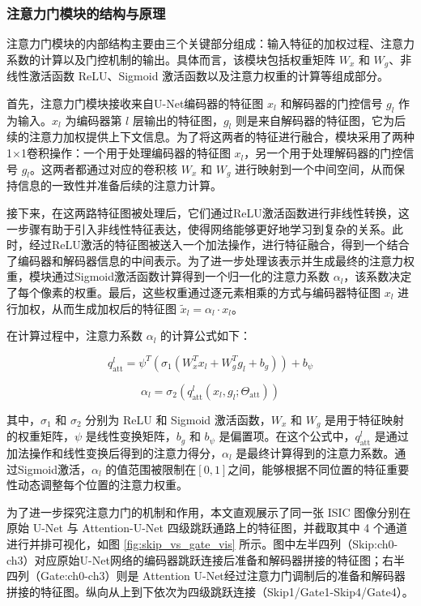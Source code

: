 \subsubsection{注意力门模块的结构与原理}

注意力门模块的内部结构主要由三个关键部分组成：输入特征的加权过程、注意力系数的计算以及门控机制的输出。具体而言，该模块包括权重矩阵 $W_x$ 和 $W_g$、非线性激活函数 ReLU、Sigmoid 激活函数以及注意力权重的计算等组成部分。

首先，注意力门模块接收来自U-Net编码器的特征图 $x_l$ 和解码器的门控信号 $g_l$ 作为输入。$x_l$ 为编码器第 $l$ 层输出的特征图，$g_l$ 则是来自解码器的特征图，它为后续的注意力加权提供上下文信息。为了将这两者的特征进行融合，模块采用了两种1×1卷积操作：一个用于处理编码器的特征图 $x_l$，另一个用于处理解码器的门控信号 $g_l$。这两者都通过对应的卷积核 $W_x$ 和 $W_g$ 进行映射到一个中间空间，从而保持信息的一致性并准备后续的注意力计算。

接下来，在这两路特征图被处理后，它们通过ReLU激活函数进行非线性转换，这一步骤有助于引入非线性特征表达，使得网络能够更好地学习到复杂的关系。此时，经过ReLU激活的特征图被送入一个加法操作，进行特征融合，得到一个结合了编码器和解码器信息的中间表示。为了进一步处理该表示并生成最终的注意力权重，模块通过Sigmoid激活函数计算得到一个归一化的注意力系数 $\alpha_l$，该系数决定了每个像素的权重。最后，这些权重通过逐元素相乘的方式与编码器特征图 $x_l$ 进行加权，从而生成加权后的特征图 $\tilde{x}_l = \alpha_l \cdot x_l$。

在计算过程中，注意力系数 $\alpha_l$ 的计算公式如下：

\begin{equation}
    q_{\text{att}}^l = \psi^T \left( \sigma_1 (W_x^T x_l + W_g^T g_l + b_g) \right) + b_\psi
\end{equation}

\begin{equation}
    \alpha_l = \sigma_2 \left( q_{\text{att}}^l(x_l, g_l; \Theta_{\text{att}}) \right)
\end{equation}

其中，$\sigma_1$ 和 $\sigma_2$ 分别为 ReLU 和 Sigmoid 激活函数，$W_x$ 和 $W_g$ 是用于特征映射的权重矩阵，$\psi$ 是线性变换矩阵，$b_g$ 和 $b_\psi$ 是偏置项。在这个公式中，$q_{\text{att}}^l$ 是通过加法操作和线性变换后得到的注意力得分，$\alpha_l$ 是最终计算得到的注意力系数。通过Sigmoid激活，$\alpha_l$ 的值范围被限制在$[0, 1]$之间，能够根据不同位置的特征重要性动态调整每个位置的注意力权重。

为了进一步探究注意力门的机制和作用，本文直观展示了同一张 ISIC 图像分别在原始 U-Net 与 Attention-U-Net 四级跳跃通路上的特征图，并截取其中 4 个通道进行并排可视化，如图 \ref{fig:skip_vs_gate_vis} 所示。图中左半四列（Skip:ch0-ch3）对应原始U-Net网络的编码器跳跃连接后准备和解码器拼接的特征图；右半四列（Gate:ch0-ch3）则是 Attention U-Net经过注意力门调制后的准备和解码器拼接的特征图。纵向从上到下依次为四级跳跃连接（Skip1/Gate1-Skip4/Gate4）。

